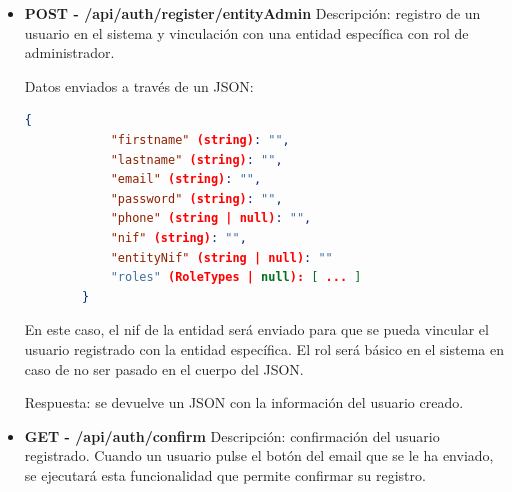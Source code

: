 \begin{itemize}
\begin{itemize}
        Datos enviados a través de un JSON:
        \begin{lstlisting}[language=json,caption={Registro de usuario}]
        {
            "firstname" (string): "",
            "lastname" (string): "",
            "email" (string): "",
            "password" (string): "",
            "phone" (string | null): "",
            "nif" (string): "",
            "entityNif" (string | null): "" 
            "roles" (RoleTypes | null): [ ... ]
        }
        \end{lstlisting}

        Es el mismo JSON que se utiliza para crear un usuario. Por defecto, el usuario que se crea a través del registro no se vincula de manera inicial a ninguna entidad, por lo que el nif de la entidad no
        se pasará, al igual que ocurre con el rol (por defecto tendrá rol básico del sistema).

        Respuesta: se devuelve un JSON con la información del usuario creado.

        \item \textbf{POST - /api/auth/register/entityAdmin} \newline
        Descripción: registro de un usuario en el sistema y vinculación con una entidad específica con rol de administrador. 
        
        Datos enviados a través de un JSON:
        \begin{lstlisting}[language=json,caption={Registro de usuario administrador de entidad}]
        {
            "firstname" (string): "",
            "lastname" (string): "",
            "email" (string): "",
            "password" (string): "",
            "phone" (string | null): "",
            "nif" (string): "",
            "entityNif" (string | null): "" 
            "roles" (RoleTypes | null): [ ... ]
        }
        \end{lstlisting}

        En este caso, el nif de la entidad será enviado para que se pueda vincular el usuario registrado con la entidad específica. El rol será básico en el sistema en caso de no ser pasado en el cuerpo del 
        JSON.

        Respuesta: se devuelve un JSON con la información del usuario creado.

        \item \textbf{GET - /api/auth/confirm} \newline
        Descripción: confirmación del usuario registrado. Cuando un usuario pulse el botón del email que se le ha enviado, se ejecutará esta funcionalidad que permite confirmar su registro. 
        

\end{itemize}
\end{itemize}
